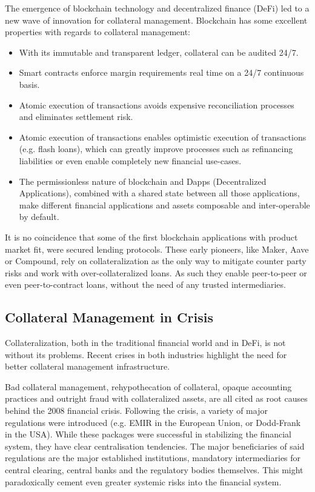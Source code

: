 \documentclass[sigconf,nonacm]{acmart}
\begin{document}
The emergence of blockchain technology and decentralized finance (DeFi) led to a new wave of innovation for collateral management.
Blockchain has some excellent properties with regards to collateral management:
\begin{itemize}
    \item With its immutable and transparent ledger, collateral can be audited 24/7.
    \item Smart contracts enforce margin requirements real time on a 24/7 continuous basis.
    \item Atomic execution of transactions avoids expensive reconciliation processes and eliminates settlement risk.
    \item Atomic execution of transactions enables optimistic execution of transactions (e.g. flash loans),
    which can greatly improve processes such as refinancing liabilities or even enable completely new financial use-cases.
    \item The permissionless nature of blockchain and Dapps (Decentralized Applications),
    combined with a shared state between all those applications,
    make different financial applications and assets composable and inter-operable by default.
\end{itemize}

It is no coincidence that some of the first blockchain applications with product market fit, were secured lending protocols.
These early pioneers, like Maker\cite{team2017dai}, Aave\cite{thornburg2020aave} or Compound\cite{leshner2019compound},
rely on collateralization as the only way to mitigate counter party risks and work with over-collateralized loans.
As such they enable peer-to-peer or even peer-to-contract loans, without the need of any trusted intermediaries.

\subsection{Collateral Management in Crisis}
Collateralization, both in the traditional financial world and in DeFi, is not without its problems.
Recent crises in both industries highlight the need for better collateral management infrastructure.

Bad collateral management, rehypothecation of collateral, opaque accounting practices
and outright fraud with collateralized assets, are all cited as root causes\cite{hellwig2008causes} behind the 2008 financial crisis.
Following the crisis, a variety of major regulations were introduced (e.g. EMIR in the European Union, or Dodd-Frank in the USA).
While these packages were successful in stabilizing the financial system, they have clear centralisation tendencies\cite{gregory2014central}.
The major beneficiaries of said regulations are the major established institutions, mandatory intermediaries for central clearing,
central banks and the regulatory bodies themselves.
This might paradoxically cement even greater systemic risks into the financial system.
\end{document}
